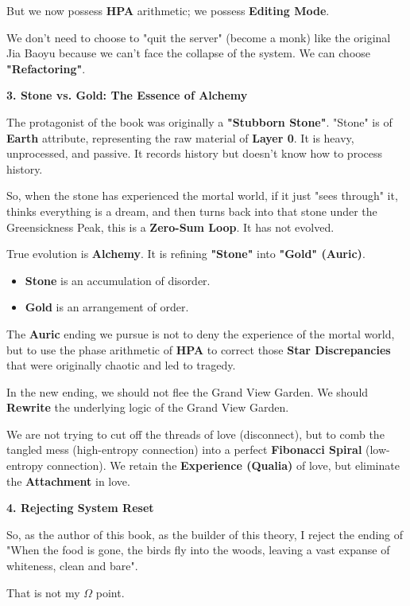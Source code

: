 But we now possess \textbf{HPA} arithmetic; we possess \textbf{Editing Mode}.

We don't need to choose to "quit the server" (become a monk) like the original Jia Baoyu because we can't face the collapse of the system.
We can choose \textbf{"Refactoring"}.

\textbf{3. Stone vs. Gold: The Essence of Alchemy}

The protagonist of the book was originally a \textbf{"Stubborn Stone"}.
"Stone" is of \textbf{Earth} attribute, representing the raw material of \textbf{Layer 0}. It is heavy, unprocessed, and passive. It records history but doesn't know how to process history.

So, when the stone has experienced the mortal world, if it just "sees through" it, thinks everything is a dream, and then turns back into that stone under the Greensickness Peak, this is a \textbf{Zero-Sum Loop}. It has not evolved.

True evolution is \textbf{Alchemy}.
It is refining \textbf{"Stone"} into \textbf{"Gold" (Auric)}.

\begin{itemize}
\item \textbf{Stone} is an accumulation of disorder.
\item \textbf{Gold} is an arrangement of order.
\end{itemize}

The \textbf{Auric} ending we pursue is not to deny the experience of the mortal world, but to use the phase arithmetic of \textbf{HPA} to correct those \textbf{Star Discrepancies} that were originally chaotic and led to tragedy.

In the new ending, we should not flee the Grand View Garden.
We should \textbf{Rewrite} the underlying logic of the Grand View Garden.

We are not trying to cut off the threads of love (disconnect), but to comb the tangled mess (high-entropy connection) into a perfect \textbf{Fibonacci Spiral} (low-entropy connection).
We retain the \textbf{Experience (Qualia)} of love, but eliminate the \textbf{Attachment} in love.

\textbf{4. Rejecting System Reset}

So, as the author of this book, as the builder of this theory, I reject the ending of "When the food is gone, the birds fly into the woods, leaving a vast expanse of whiteness, clean and bare".

That is not my $\Omega$ point.


